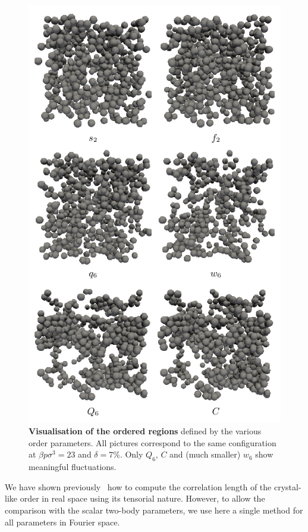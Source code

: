 \documentclass[twocolumn,superscriptaddress]{revtex4-1}
\begin{document}
\begin{figure}
	\centering
	\includegraphics{fig_3D}
	\caption{\textbf{Visualisation of the ordered regions} defined by the various order parameters. All pictures correspond to the same configuration at $\beta p\sigma^3=23$ and $\delta=7\%$. Only $Q_6$, $C$ and (much smaller) $w_6$ show meaningful fluctuations.}
	\label{fig:3D}
\end{figure}

We have shown previously~\cite{tanaka,kawasaki,mathieu_icosahedra,russo_gcm,russo_hs} how to compute the correlation length of the crystal-like order in real space using its tensorial nature. However, to allow the comparison with the scalar two-body parameters, we use here a single method for all parameters in Fourier space.
\end{document}
